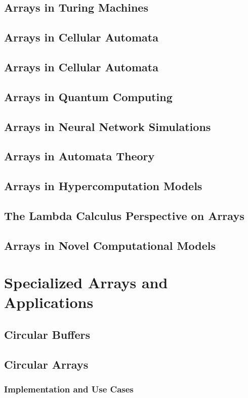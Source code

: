 \documentclass[12pt, oneside]{book}
\begin{document}
	\section{Arrays in Turing Machines}
	\section{Arrays in Cellular Automata}
	\section{Arrays in Cellular Automata}
	\section{Arrays in Quantum Computing}
	\section{Arrays in Neural Network Simulations}
	\section{Arrays in Automata Theory}
	\section{Arrays in Hypercomputation Models}
	\section{The Lambda Calculus Perspective on Arrays}
	\section{Arrays in Novel Computational Models}
	
	\chapter{Specialized Arrays and Applications}
	\section{Circular Buffers}
	\section{Circular Arrays}
	\subsection{Implementation and Use Cases}
\end{document}
